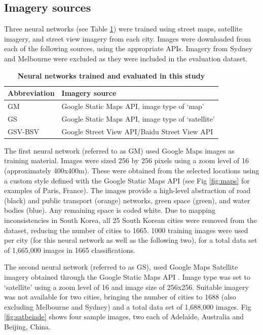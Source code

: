 \documentclass[10pt,letterpaper,hidelinks]{article}
\begin{document}
\label{methodsimagery}
\subsection*{Imagery sources}

Three neural networks (see Table \ref{tab:neuralnetworks}) were trained using street maps, satellite imagery, and street view imagery from each city. Images were downloaded from each of the following sources, using the appropriate APIs. Imagery from Sydney and Melbourne were excluded as they were included in the evaluation dataset. 


\begin{table}[!htbp]
\caption{\bf Neural networks trained and evaluated in this study \label{tab:neuralnetworks}}     
\begin{tabular}{ l l }
 \hline Abbreviation   &  Imagery source \\ \hline
GM & Google Static Maps API, image type of `map'     \\ 
GS & Google Static Maps API, image type of `satellite'      \\
GSV-BSV & Google Street View API/Baidu Street View API     \\ \hline

\end{tabular}
\end{table}

The first neural network (referred to as GM) used Google Maps images as training material. Images were sized 256 by 256 pixels using a zoom level of 16 (approximately 400x400m). These were obtained from the selected locations using a custom style defined with the Google Static Maps API \cite{GoogleStatic2017} (see Fig \ref{fig:maps} for examples of Paris, France). The images provide a high-level abstraction of road (black) and public transport (orange) networks, green space (green), and water bodies (blue). Any remaining space is coded white. Due to mapping inconsistencies in South Korea, all 25 South Korean cities were removed from the dataset, reducing the number of cities to 1665. 1000 training images were used per city (for this neural network as well as the following two), for a total data set of 1,665,000 images in 1665 classifications. 

The second neural network (referred to as GS), used Google Maps Satellite imagery obtained through the Google Static Maps API \cite{GoogleStatic2017}. Image type was set to `satellite' using a zoom level of 16 and image size of 256x256. Suitable imagery was not available for two cities, bringing the number of cities to 1688 (also excluding Melbourne and Sydney) and a total data set of 1,688,000 images. Fig \ref{fig:satbeiade} shows four sample images, two each of Adelaide, Australia and Beijing, China. 
\end{document}
